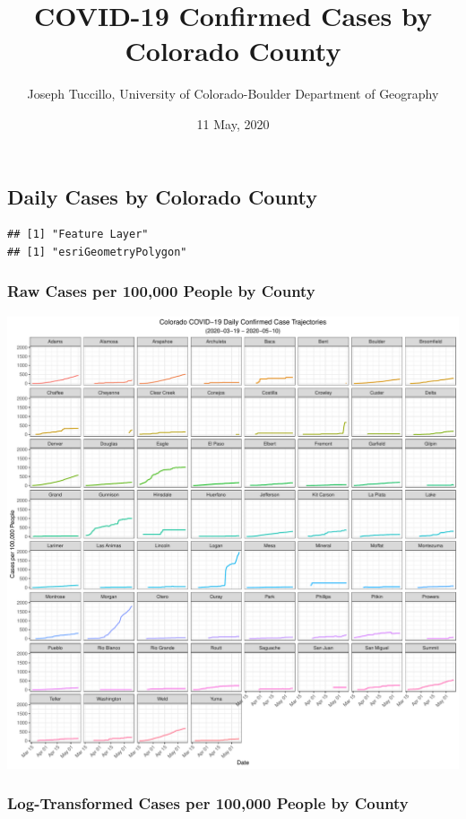 \documentclass[]{article}
\title{COVID-19 Confirmed Cases by Colorado County}
\author{Joseph Tuccillo, University of Colorado-Boulder Department of Geography}
\date{11 May, 2020}
\begin{document}
\maketitle

\hypertarget{daily-cases-by-colorado-county}{%
\subsection{Daily Cases by Colorado
County}\label{daily-cases-by-colorado-county}}

\begin{verbatim}
## [1] "Feature Layer"
## [1] "esriGeometryPolygon"
\end{verbatim}

\hypertarget{raw-cases-per-100000-people-by-county}{%
\subsubsection{Raw Cases per 100,000 People by
County}\label{raw-cases-per-100000-people-by-county}}

\includegraphics{figs/daily-cases-100k-1.pdf}

\hypertarget{log-transformed-cases-per-100000-people-by-county}{%
\subsubsection{Log-Transformed Cases per 100,000 People by
County}\label{log-transformed-cases-per-100000-people-by-county}}
\end{document}
